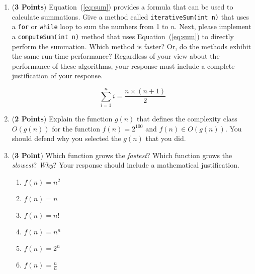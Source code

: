 \documentclass[12pt]{article}
\begin{document}
\begin{enumerate}
\begin{enumerate}
\begin{enumerate}
    \item ({\bf 3 Points}) Equation~(\ref{eq:sum}) provides a formula that can be used to calculate summations.  Give a
      method called {\tt iterativeSum(int n)} that uses a {\tt for} or {\tt while} loop to sum the numbers from 1 to
      $n$.  Next, please implement a {\tt computeSum(int n)} method that uses Equation~(\ref{eq:sum}) to directly
      perform the summation.  Which method is faster?  Or, do the methods exhibit the same run-time performance?
      Regardless of your view about the performance of these algorithms, your response must include a complete
      justification of your response.

      \begin{equation}
        \sum_{i=1}^{n}i = \frac{n \times (n+1)}{2}
        \label{eq:sum}
      \end{equation}

    \item ({\bf 2 Points}) Explain the function $g(n)$ that defines the complexity class $O(g(n))$ for the function
      $f(n) = 2^{100}$ and $f(n) \in O(g(n))$.  You should defend why you selected the $g(n)$ that you did.

    \item ({\bf 3 Point}) Which function grows the {\em fastest}? Which function grows the {\em slowest}?  {\em Why}?
      Your response should include a mathematical justification.

      \begin{enumerate}

        \item $f(n) = n^2$

        \item $f(n) = n$

        \item $f(n) = n!$

        \item $f(n) = n^n$

        \item $f(n) = 2^n$

        \item $f(n) = \frac{n}{n}$

      \end{enumerate}

\end{enumerate}



\end{enumerate}
\end{enumerate}
\end{document}
